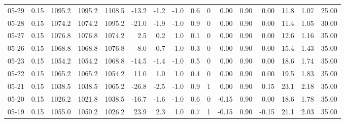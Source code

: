 \begin{threeparttable}
{\begin{tabular}{lrrrrrrrrrrrrrrr}
  05-29 &     0.15 & 1095.2 & 1095.2 & 1108.5 &      -13.2 &           -1.2 &                     -1.0 &                 0.6 &              0 &       0.00 &      0.90 &           0.00 &             11.8 &            1.07 &                  25.00 \\
  05-28 &     0.15 & 1074.2 & 1074.2 & 1095.2 &      -21.0 &           -1.9 &                     -1.0 &                 0.9 &              0 &       0.00 &      0.90 &           0.00 &             11.4 &            1.05 &                  30.00 \\
  05-27 &     0.15 & 1076.8 & 1076.8 & 1074.2 &        2.5 &            0.2 &                      1.0 &                 0.1 &              0 &       0.00 &      0.90 &           0.00 &             12.6 &            1.16 &                  35.00 \\
  05-26 &     0.15 & 1068.8 & 1068.8 & 1076.8 &       -8.0 &           -0.7 &                     -1.0 &                 0.3 &              0 &       0.00 &      0.90 &           0.00 &             15.4 &            1.43 &                  35.00 \\
  05-23 &     0.15 & 1054.2 & 1054.2 & 1068.8 &      -14.5 &           -1.4 &                     -1.0 &                 0.5 &              0 &       0.00 &      0.90 &           0.00 &             18.6 &            1.74 &                  35.00 \\
  05-22 &     0.15 & 1065.2 & 1065.2 & 1054.2 &       11.0 &            1.0 &                      1.0 &                 0.4 &              0 &       0.00 &      0.90 &           0.00 &             19.5 &            1.83 &                  35.00 \\
  05-21 &     0.15 & 1038.5 & 1038.5 & 1065.2 &      -26.8 &           -2.5 &                     -1.0 &                 0.9 &              1 &       0.00 &      0.90 &           0.15 &             23.1 &            2.18 &                  35.00 \\
  05-20 &     0.15 & 1026.2 & 1021.8 & 1038.5 &      -16.7 &           -1.6 &                     -1.0 &                 0.6 &              0 &      -0.15 &      0.90 &           0.00 &             18.6 &            1.78 &                  35.00 \\
  05-19 &     0.15 & 1055.0 & 1050.2 & 1026.2 &       23.9 &            2.3 &                      1.0 &                 0.7 &              1 &      -0.15 &      0.90 &          -0.15 &             21.1 &            2.03 &                  35.00 \\

\end{tabular}}
\end{threeparttable}
